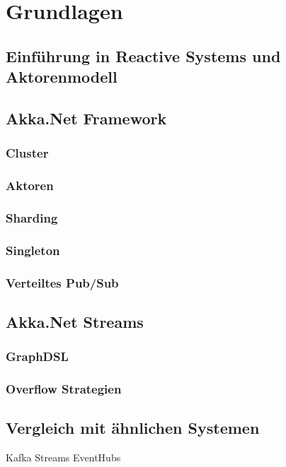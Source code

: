 \chapter{Grundlagen}

\section{Einführung in Reactive Systems und Aktorenmodell}

\section{Akka.Net Framework}

\subsection{Cluster}
\subsection{Aktoren}
\subsection{Sharding}
\subsection{Singleton}
\subsection{Verteiltes Pub/Sub}

\section{Akka.Net Streams}

\subsection{GraphDSL}
\subsection{Overflow Strategien}


\section{Vergleich mit ähnlichen Systemen}
Kafka Streams EventHubs